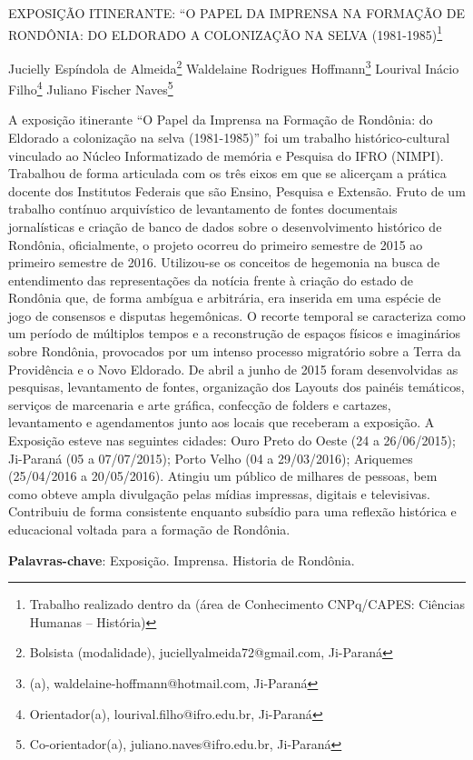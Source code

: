 \documentclass[article,12pt,onesidea,4paper,english,brazil]{abntex2}
\begin{document}
	
	
	\frenchspacing 
	
	\begin{center}
		\LARGE EXPOSIÇÃO ITINERANTE: “O PAPEL DA IMPRENSA NA FORMAÇÃO DE RONDÔNIA: DO ELDORADO A COLONIZAÇÃO NA SELVA (1981-1985)\footnote{Trabalho realizado dentro da (área de Conhecimento CNPq/CAPES: Ciências Humanas – História)}
		
		\normalsize
		Jucielly Espíndola de Almeida\footnote{Bolsista (modalidade), juciellyalmeida72@gmail.com, Ji-Paraná} 
		Waldelaine Rodrigues Hoffmann\footnote{(a), waldelaine-hoffmann@hotmail.com, Ji-Paraná} 
		Lourival Inácio Filho\footnote{Orientador(a), lourival.filho@ifro.edu.br,  Ji-Paraná} 
		Juliano Fischer Naves\footnote{Co-orientador(a), juliano.naves@ifro.edu.br, Ji-Paraná} 
	\end{center}
	
	\noindent A exposição itinerante “O Papel da Imprensa na Formação de Rondônia: do Eldorado a colonização na selva (1981-1985)” foi um trabalho histórico-cultural vinculado ao Núcleo Informatizado de memória e Pesquisa do IFRO (NIMPI). Trabalhou de forma articulada com os três eixos em que se alicerçam a prática docente dos Institutos Federais que são Ensino, Pesquisa e Extensão. Fruto de um trabalho contínuo arquivístico de levantamento de fontes documentais jornalísticas e criação de banco de dados sobre o desenvolvimento histórico de Rondônia, oficialmente, o projeto ocorreu do primeiro semestre de 2015 ao primeiro semestre de 2016. Utilizou-se os conceitos de hegemonia na busca de entendimento das representações da notícia frente à criação do estado de Rondônia que, de forma ambígua e arbitrária, era inserida em uma espécie de jogo de consensos e disputas hegemônicas. O recorte temporal se caracteriza como um período de múltiplos tempos e a reconstrução de espaços físicos e imaginários sobre Rondônia, provocados por um intenso processo migratório sobre a Terra da Providência e o Novo Eldorado. De abril a junho de 2015 foram desenvolvidas as pesquisas, levantamento de fontes, organização dos Layouts dos painéis temáticos, serviços de marcenaria e arte gráfica, confecção de folders e cartazes, levantamento e agendamentos junto aos locais que receberam a exposição. A Exposição esteve nas seguintes cidades: Ouro Preto do Oeste (24 a 26/06/2015); Ji-Paraná (05 a 07/07/2015); Porto Velho (04 a 29/03/2016); Ariquemes (25/04/2016 a 20/05/2016). Atingiu um público de milhares de pessoas, bem como obteve ampla divulgação pelas mídias impressas, digitais e televisivas. Contribuiu de forma consistente enquanto subsídio para uma reflexão histórica e educacional voltada para a formação de Rondônia.
	
	\vspace{\onelineskip}
	
	\noindent
	\textbf{Palavras-chave}: Exposição. Imprensa. Historia de Rondônia.
	
\end{document}
